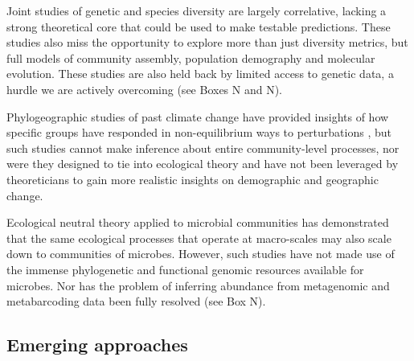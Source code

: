 \documentclass[12pt]{article}
\begin{document}
Joint studies of genetic and species diversity
\cite{Vanoverbeke2015-ym, Vellend2005-up, Vellend2014-ir,
  Papadopoulou2011-bd} are largely correlative, lacking a strong
theoretical core that could be used to make testable
predictions. These studies also miss the opportunity to explore more
than just diversity metrics, but full models of community assembly,
population demography and molecular evolution.  These studies are also
held back by limited access to genetic data, a hurdle we are actively
overcoming (see Boxes N and N).

Phylogeographic studies of past climate change have provided insights
of how specific groups have responded in non-equilibrium ways to
perturbations \cite{Arbogast2001-jx, Smith2012-db, Hickerson2005-ek,
  Satler2016-lb}, but such studies cannot make inference about entire
community-level processes, nor were they designed to tie into
ecological theory and have not been leveraged by theoreticians to gain
more realistic insights on demographic and geographic change.

Ecological neutral theory applied to microbial communities
\cite{Venkataraman2015-rk} has demonstrated that the same ecological
processes that operate at macro-scales may also scale down to
communities of microbes. However, such studies have not made use of
the immense phylogenetic and functional genomic resources available
for microbes. Nor has the problem of inferring abundance from
metagenomic and metabarcoding data been fully resolved (see Box N).

\subsection{Emerging approaches}
\end{document}
